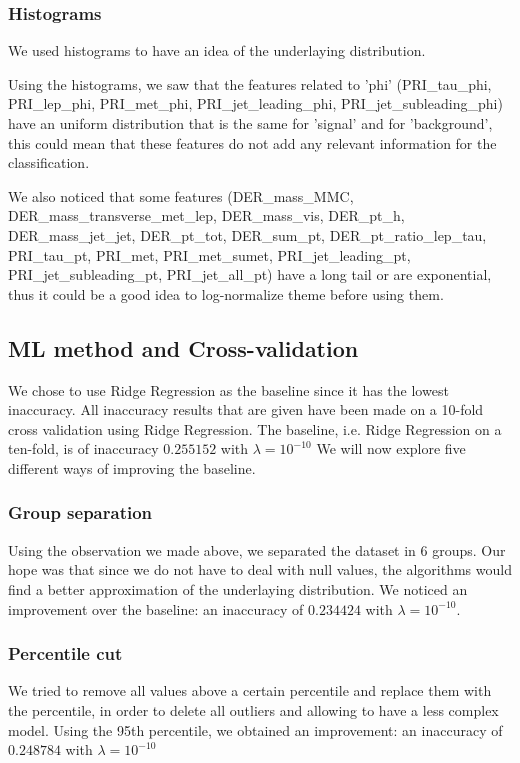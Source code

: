 \documentclass[10pt,conference,compsocconf]{IEEEtran}
\begin{document}
\subsubsection{Histograms}

We used histograms to have an idea of the underlaying distribution.

Using the histograms, we saw that the features related to 'phi' (PRI\_tau\_phi,
PRI\_lep\_phi, PRI\_met\_phi, PRI\_jet\_leading\_phi, PRI\_jet\_subleading\_phi)
have an uniform distribution that is the same
for 'signal' and for 'background', this could mean that these features do not add
any relevant information for the classification.

We also noticed that some features (DER\_mass\_MMC, DER\_mass\_transverse\_met\_lep, DER\_mass\_vis, DER\_pt\_h, DER\_mass\_jet\_jet, DER\_pt\_tot, DER\_sum\_pt, DER\_pt\_ratio\_lep\_tau, PRI\_tau\_pt, PRI\_met, PRI\_met\_sumet, PRI\_jet\_leading\_pt, PRI\_jet\_subleading\_pt, PRI\_jet\_all\_pt) have a long tail or are exponential, thus it could be a good
idea to log-normalize theme before using them.

\subsection{ML method and Cross-validation}
We chose to use Ridge Regression as the baseline since it has the lowest
inaccuracy.
All inaccuracy results that are given have been made on a 10-fold cross validation
using Ridge Regression. The baseline, i.e. Ridge Regression on a ten-fold, is
of inaccuracy $0.255152$ with $\lambda = 10^{-10}$
We will now explore five different ways of improving the baseline.

\subsubsection{Group separation}
Using the observation we made above, we separated the dataset in 6 groups. Our
hope was that since we do not have to deal with null values, the algorithms
would find a better approximation of the underlaying distribution. We noticed an
improvement over the baseline: an inaccuracy of $0.234424$ with $\lambda =
10^{-10}$.

\subsubsection{Percentile cut}
We tried to remove all values above a certain percentile and replace them with
the percentile, in order to delete all outliers and allowing to have a less
complex model. Using the 95th percentile, we obtained an improvement: an
inaccuracy of $0.248784$ with $\lambda = 10^{-10}$
\end{document}
